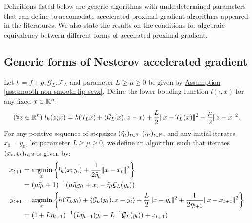 \documentclass[12pt]{article}
\begin{document}
        Definitions listed below are generic algorithms with underdetermined parameters that can define to accomodate accelerated proximal gradient algorithms appeared in the literatures. 
        We also state the results on the conditions for algebraic equivalency between different forms of accelrated proximal gradient. 
    \subsection{Generic forms of Nesterov accelerated gradient}
        \newcommand{\SCPPMAPG}{SC PPM APG}
        \begin{definition}[\SCPPMAPG]\label{def:SC-PPM-APG}
            
            Let $h = f + g, \mathcal G_L, \mathcal T_L$ and parameter $L \ge \mu \ge 0$ be given by
            \hyperref[ass:smooth-non-smooth-lip-scvx]
            {Assumption \ref*{ass:smooth-non-smooth-lip-scvx}}. 
            Define the lower bouding function $l(\cdot, x)$ for any fixed $x \in \mathbb R^n$: 
            \begin{align*}
                (\forall z \in \mathbb R^n) \; l_h(z; x) = h(\mathcal T_L x) + \langle \mathcal G_L (x), z - x\rangle
                + 
                \frac{L}{2}\Vert x - \mathcal T_L (x)\Vert^2 + \frac{\mu}{2}\Vert z - x\Vert^2. 
            \end{align*}
            For any positive sequence of stepsizes $(\tilde \eta_t)_{t \in \mathbb N}, (\eta_t)_{t \in \mathbb N}$, and any initial iterates $x_0 = y_0$, let parameter $L \ge \mu \ge 0$, we define an algorithm such that iterates $(x_t, y_t)_{t \in \mathbb N}$ is given by: 
            \begin{align*}
                x_{t + 1} &= \mathop{\rm argmin}\limits_{x} \left\lbrace
                l_h(x; y_t) + \frac{1}{2\tilde \eta_{t}} 
                \Vert x - x_t\Vert^2
                \right\rbrace
                \\
                &= (\mu\tilde \eta_{t} + 1)^{-1} 
                (\mu\tilde \eta_{t}y_t + x_t - \tilde \eta_{t}\mathcal G_L(y_t))
                \\
                y_{t + 1}&= 
                \mathop{\rm argmin}\limits_{x}
                \left\lbrace
                    h(\mathcal T_L y_t) + \langle \mathcal G_L(y_t), x - y_t\rangle + \frac{L}{2}\Vert x -y_t\Vert^2
                    + \frac{1}{2\eta_{t + 1}}\Vert x - x_{t + 1}\Vert^2
                \right\rbrace
                \\
                &= (1 + L \eta_{t +1})^{-1}(L\eta_{t + 1}(y_t - L^{-1}\mathcal G_L(y_t)) + x_{t + 1})
            \end{align*}
        \end{definition}
\end{document}
